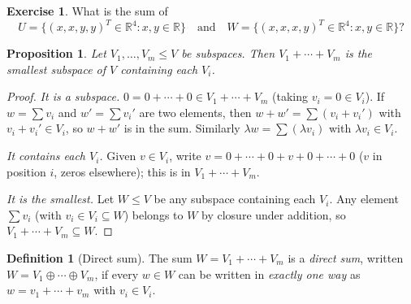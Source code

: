 \documentclass[11pt]{article}
\theoremstyle{definition}
\newtheorem{definition}{Definition}[section]
\newtheorem{exercise}{Exercise}[section]
\theoremstyle{plain}
\newtheorem{proposition}{Proposition}[section]
\begin{document}
\begin{exercise}
  What is the sum of
  \[
    U = \{(x, x, y, y)^T\in\mathbb{R}^4 : x,y\in\mathbb{R}\}
    \quad\text{and}\quad
    W = \{(x, x, x, y)^T\in\mathbb{R}^4 : x,y\in\mathbb{R}\}?
  \]
\end{exercise}

\begin{proposition}
  Let $V_1,\ldots,V_m\le V$ be subspaces.  Then $V_1+\cdots+V_m$ is the
  \emph{smallest} subspace of $V$ containing each $V_i$.
\end{proposition}
\begin{proof}
  \textit{It is a subspace.}
  $0 = 0+\cdots+0\in V_1+\cdots+V_m$ (taking $v_i=0\in V_i$).
  If $w = \sum v_i$ and $w' = \sum v_i'$ are two elements, then
  $w+w' = \sum(v_i+v_i')$ with $v_i+v_i'\in V_i$, so $w+w'$ is in the sum.
  Similarly $\lambda w = \sum(\lambda v_i)$ with $\lambda v_i\in V_i$.

  \textit{It contains each $V_i$.}
  Given $v\in V_i$, write $v = 0+\cdots+0+v+0+\cdots+0$
  ($v$ in position $i$, zeros elsewhere); this is in $V_1+\cdots+V_m$.

  \textit{It is the smallest.}
  Let $W\le V$ be any subspace containing each $V_i$.  Any element
  $\sum v_i$ (with $v_i\in V_i\subseteq W$) belongs to $W$ by closure under
  addition, so $V_1+\cdots+V_m\subseteq W$.
\end{proof}

\begin{definition}[Direct sum]
  The sum $W = V_1+\cdots+V_m$ is a \emph{direct sum}, written
  $W = V_1\oplus\cdots\oplus V_m$, if every $w\in W$ can be written in
  \emph{exactly one way} as $w = v_1+\cdots+v_m$ with $v_i\in V_i$.
\end{definition}
\end{document}
